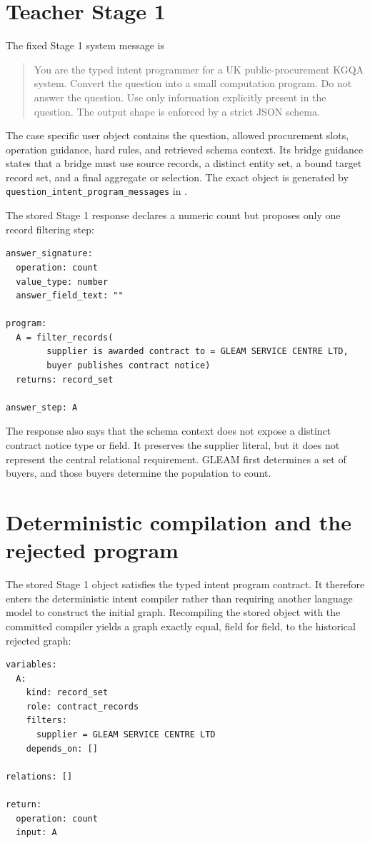 \documentclass[10pt]{article}
\begin{document}
\section{Teacher Stage 1}

The fixed Stage 1 system message is
\begin{quote}\small
You are the typed intent programmer for a UK public-procurement KGQA system. Convert the question
into a small computation program. Do not answer the question. Use only information explicitly
present in the question. The output shape is enforced by a strict JSON schema.
\end{quote}

The case specific user object contains the question, allowed procurement slots, operation
guidance, hard rules, and retrieved schema context.  Its bridge guidance states that a bridge must
use source records, a distinct entity set, a bound target record set, and a final aggregate or
selection.  The exact object is generated by
\texttt{question\_intent\_program\_messages} in
.

The stored Stage 1 response declares a numeric count but proposes only one record filtering step:
\begin{verbatim}
answer_signature:
  operation: count
  value_type: number
  answer_field_text: ""

program:
  A = filter_records(
        supplier is awarded contract to = GLEAM SERVICE CENTRE LTD,
        buyer publishes contract notice)
  returns: record_set

answer_step: A
\end{verbatim}

The response also says that the schema context does not expose a distinct contract notice type or
field.  It preserves the supplier literal, but it does not represent the central relational
requirement.  GLEAM first determines a set of buyers, and those buyers determine the population to
count.

\section{Deterministic compilation and the rejected program}

The stored Stage 1 object satisfies the typed intent program contract.  It therefore enters the
deterministic intent compiler rather than requiring another language model to construct the initial
graph.  Recompiling the stored object with the committed compiler yields a graph exactly equal,
field for field, to the historical rejected graph:
\begin{verbatim}
variables:
  A:
    kind: record_set
    role: contract_records
    filters:
      supplier = GLEAM SERVICE CENTRE LTD
    depends_on: []

relations: []

return:
  operation: count
  input: A
\end{verbatim}
\end{document}
